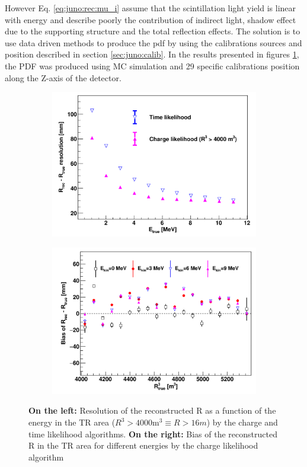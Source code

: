 However Eq. \ref{eq:juno:rec:mu_i} assume that the scintillation light yield is linear with energy and describe poorly the contribution of indirect light, shadow effect due to the supporting structure and the total reflection effects. The solution is to use data driven methods to produce the pdf by using the calibrations sources and position described in section \ref{sec:juno:calib}. In the results presented in figures \ref{fig:juno:rec:time_charge_results}, the PDF was produced using MC simulation and 29 specific calibrations position \cite{li_event_2021} along the Z-axis of the detector.
\begin{figure}[ht]
  \centering
  \begin{subfigure}[b]{0.48\linewidth}
    \centering
    \includegraphics[width=\textwidth]{images/juno/reco/charge_likelihood_res.png}
  \end{subfigure}
  \hfill
  \begin{subfigure}[b]{0.48\linewidth}
    \centering
    \includegraphics[width=\textwidth]{images/juno/reco/charge_likelihood_bias.png}
  \end{subfigure}
  \caption{\textbf{On the left:} Resolution of the reconstructed R as a function of the energy in the TR area ($R^3 > 4000 \mathrm{m}^3 \equiv R > 16 m$) by the charge and time likelihood algorithms. \textbf{On the right:} Bias of the reconstructed R in the TR area for different energies by the charge likelihood algorithm}
  \label{fig:juno:rec:time_charge_results}
\end{figure}
